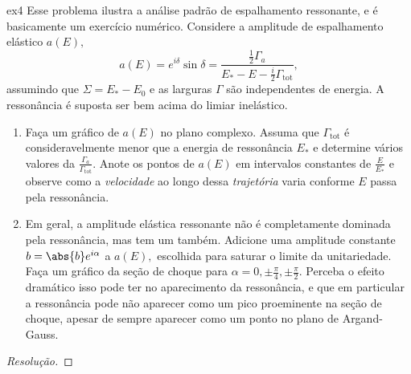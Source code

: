 \begin{exercício}{}{ex4}
   Esse problema ilustra a análise padrão de espalhamento ressonante, e é basicamente um exercício numérico. Considere a amplitude de espalhamento elástico \(a(E),\)
   \begin{equation*}
      a(E) = e^{i \delta} \sin \delta = \frac{\frac12 \Gamma_a}{E_* - E - \frac{i}{2} \Gamma_\mathrm{tot}},
   \end{equation*}
   assumindo que \(\Sigma = E_* - E_0\) e as larguras \(\Gamma\) são independentes de energia. A ressonância é suposta ser bem acima do limiar inelástico.
   \begin{enumerate}[label=(\alph*)]
      \item Faça um gráfico de \(a(E)\) no plano complexo. Assuma que \(\Gamma_{\mathrm{tot}}\) é consideravelmente menor que a energia de ressonância \(E_*\) e determine vários valores da  \(\frac{\Gamma_a}{\Gamma_{\mathrm{tot}}}\). Anote os pontos de \(a(E)\) em intervalos constantes de \(\frac{E}{E_*}\) e observe como a \emph{velocidade} ao longo dessa \emph{trajetória} varia conforme \(E\) passa pela ressonância.
      \item Em geral, a amplitude elástica ressonante não é completamente dominada pela ressonância, mas tem um  também. Adicione uma amplitude constante \(b = \abs{b}e^{i\alpha}\) a \(a(E),\) escolhida para saturar o limite da unitariedade. Faça um gráfico da seção de choque para \(\alpha = 0, \pm \frac{\pi}{4},\pm \frac{\pi}{2}.\) Perceba o efeito dramático isso pode ter no aparecimento da ressonância, e que em particular a ressonância pode não aparecer como um pico proeminente na seção de choque, apesar de sempre aparecer como um ponto  no plano de Argand-Gauss.
   \end{enumerate}
\end{exercício}
\begin{proof}[Resolução]
    
\end{proof}

